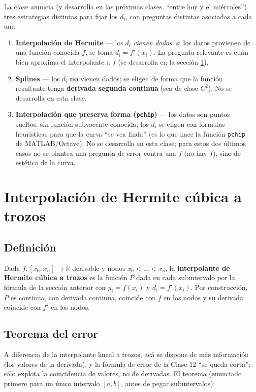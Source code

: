 \documentclass[12pt,a4paper]{article}
\begin{document}
La clase anuncia (y desarrolla en las próximas clases, ``entre hoy y el
miércoles'') tres estrategias distintas para fijar los $d_i$, con preguntas
distintas asociadas a cada una:

\begin{enumerate}
  \item \textbf{Interpolación de Hermite} --- los $d_i$ \emph{vienen
  dados}: si los datos provienen de una función conocida $f$, se toma
  $d_i = f'(x_i)$. La pregunta relevante es cuán bien aproxima el
  interpolante a $f$ (se desarrolla en la sección \ref{sec:hermite}).
  \item \textbf{Splines} --- los $d_i$ \textbf{no} vienen dados; se eligen
  de forma que la función resultante tenga \textbf{derivada segunda
  continua} (sea de clase $C^2$). No se desarrolla en esta clase.
  \item \textbf{Interpolación que preserva forma (\texttt{pchip})} --- los
  datos son puntos sueltos, sin función subyacente conocida; los $d_i$ se
  eligen con fórmulas heurísticas para que la curva ``se vea linda'' (es lo
  que hace la función \texttt{pchip} de MATLAB/Octave). No se desarrolla en
  esta clase; para estos dos últimos casos no se plantea una pregunta de
  error contra una $f$ (no hay $f$), sino de estética de la curva.
\end{enumerate}

\section{Interpolación de Hermite cúbica a trozos}
\label{sec:hermite}

\subsection{Definición}

Dada $f:[x_0,x_n]\to\mathbb{R}$ derivable y nodos $x_0<\dots<x_n$, la
\textbf{interpolante de Hermite cúbica a trozos} es la función $P$ dada en
cada subintervalo por la fórmula de la sección anterior con $y_i = f(x_i)$
y $d_i = f'(x_i)$. Por construcción, $P$ es continua, con derivada
continua, coincide con $f$ en los nodos y su derivada coincide con $f'$ en
los nodos.

\subsection{Teorema del error}

A diferencia de la interpolante lineal a trozos, acá se dispone de más
información (los valores de la derivada), y la fórmula de error de la
Clase 12 ``se queda corta'': sólo explota la coincidencia de valores, no de
derivadas. El teorema (enunciado primero para un único intervalo $[a,b]$,
antes de pegar subintervalos):
\end{document}
